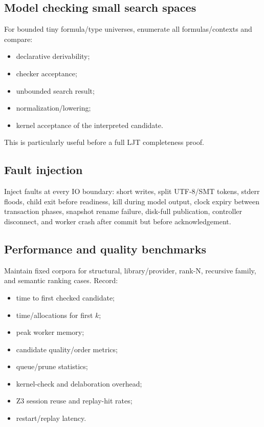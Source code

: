 \documentclass[10pt,letterpaper,oneside]{report}
\begin{document}
\subsection{Model checking small search spaces}

For bounded tiny formula/type universes, enumerate all formulas/contexts and compare:

\begin{itemize}
  \item declarative derivability;
  \item checker acceptance;
  \item unbounded search result;
  \item normalization/lowering;
  \item kernel acceptance of the interpreted candidate.
\end{itemize}

This is particularly useful before a full LJT completeness proof.

\subsection{Fault injection}

Inject faults at every IO boundary: short writes, split UTF-8/SMT tokens, stderr floods, child exit before readiness, kill during model output, clock expiry between transaction phases, snapshot rename failure, disk-full publication, controller disconnect, and worker crash after commit but before acknowledgement.

\subsection{Performance and quality benchmarks}

Maintain fixed corpora for structural, library/provider, rank-N, recursive family, and semantic ranking cases. Record:

\begin{itemize}
  \item time to first checked candidate;
  \item time/allocations for first \(k\);
  \item peak worker memory;
  \item candidate quality/order metrics;
  \item queue/prune statistics;
  \item kernel-check and delaboration overhead;
  \item Z3 session reuse and replay-hit rates;
  \item restart/replay latency.
\end{itemize}
\end{document}
